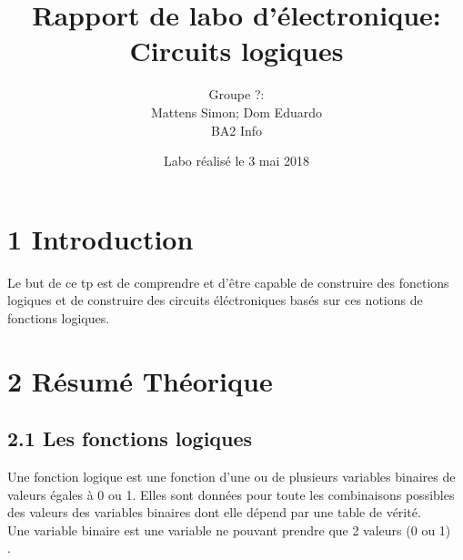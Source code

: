 \documentclass{report}
\title{Rapport de labo d'\'electronique: \\ Circuits logiques}
\author{Groupe ?: \\ Mattens Simon; Dom Eduardo \\ BA2 Info}
\date{Labo r\'ealis\'e le 3 mai 2018}
\begin{document}
\maketitle




\section*{1 Introduction}

\hspace*{1,5cm}Le but de ce tp est de comprendre et d'\^etre capable de construire des fonctions logiques et de construire des circuits éléctroniques basés sur ces notions de fonctions logiques.\\

\section*{2 R\'esum\'e Th\'eorique}
\subsection*{2.1 Les fonctions logiques}
\hspace*{1,5cm} Une fonction logique est une fonction d'une ou de plusieurs variables binaires de valeurs égales à 0 ou 1. Elles sont données pour toute les combinaisons possibles des valeurs des variables binaires dont elle dépend par une table de vérité.\\
Une variable binaire est une variable ne pouvant prendre que 2 valeurs (0 ou 1)\\. 
\end{document}
